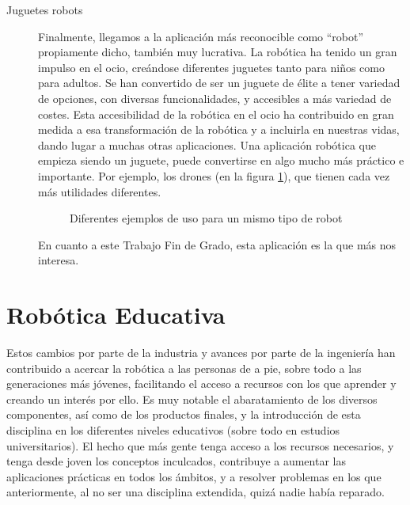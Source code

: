 \begin{description}
	\item [Juguetes robots] Finalmente, llegamos a la aplicación más reconocible como ``robot'' propiamente dicho, también muy lucrativa. La robótica ha tenido un gran impulso en el ocio, creándose diferentes juguetes tanto para niños como para adultos. Se han convertido de ser un juguete de élite a tener variedad de opciones, con diversas funcionalidades, y accesibles a más variedad de costes. Esta accesibilidad de la robótica en el ocio ha contribuido en gran medida a esa transformación de la robótica y a incluirla en nuestras vidas, dando lugar a muchas otras aplicaciones. Una aplicación robótica que empieza siendo un juguete, puede convertirse en algo mucho más práctico e importante. Por ejemplo, los drones (en la figura \ref{img:drones}), que tienen cada vez más utilidades diferentes.
	
	\begin{figure}[h]
		\centering
		\begin{subfigure}
			[Drone teledirigido orientado al ocio grabando deporte] {
				\texttt{[image: droneski.jpg]}
				\label{img:drone1}}
		\end{subfigure}
		\begin{subfigure}
			[Drone de ayuda humanitaria] {
				\texttt{[image: dronerescate.jpg]}
				\label{img:drone2}}
		\end{subfigure}
		\caption{Diferentes ejemplos de uso para un mismo tipo de robot}
		\label{img:drones}
	\end{figure}
	
	
	En cuanto a este Trabajo Fin de Grado, esta aplicación es la que más nos interesa.
\end{description}

\section{Robótica Educativa}


Estos cambios por parte de la industria y avances por parte de la ingeniería han contribuido a acercar la robótica a las personas de a pie, sobre todo a las generaciones más jóvenes, facilitando el acceso a recursos con los que aprender y creando un interés por ello. Es muy notable el abaratamiento de los diversos componentes, así como de los productos finales, y la introducción de esta disciplina en los diferentes niveles educativos (sobre todo en estudios universitarios). El hecho que más gente tenga acceso a los recursos necesarios, y tenga desde joven los conceptos inculcados, contribuye a aumentar las aplicaciones prácticas en todos los ámbitos, y a resolver problemas en los que anteriormente, al no ser una disciplina extendida, quizá nadie había reparado. \\

